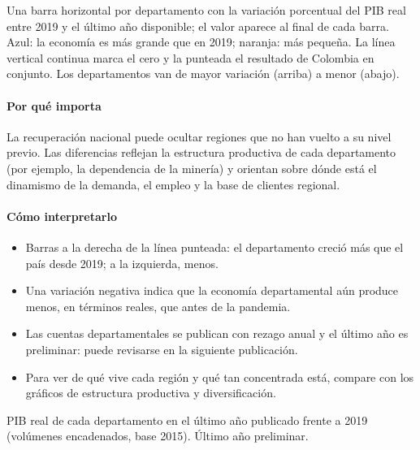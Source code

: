 \begin{leer}
Una barra horizontal por departamento con la variación porcentual del PIB real entre 2019 y el último año disponible; el valor aparece al final de cada barra. Azul: la economía es más grande que en 2019; naranja: más pequeña. La línea vertical continua marca el cero y la punteada el resultado de Colombia en conjunto. Los departamentos van de mayor variación (arriba) a menor (abajo).
\end{leer}

\paragraph{Por qué importa}
La recuperación nacional puede ocultar regiones que no han vuelto a su nivel previo. Las diferencias reflejan la estructura productiva de cada departamento (por ejemplo, la dependencia de la minería) y orientan sobre dónde está el dinamismo de la demanda, el empleo y la base de clientes regional.

\paragraph{Cómo interpretarlo}
\begin{itemize}
\item Barras a la derecha de la línea punteada: el departamento creció más que el país desde 2019; a la izquierda, menos.
\item Una variación negativa indica que la economía departamental aún produce menos, en términos reales, que antes de la pandemia.
\item Las cuentas departamentales se publican con rezago anual y el último año es preliminar: puede revisarse en la siguiente publicación.
\item Para ver de qué vive cada región y qué tan concentrada está, compare con los gráficos de estructura productiva y diversificación.
\end{itemize}
\begin{formulas}[Fórmulas]
\end{formulas}
\begin{metodo}[Metodología]
PIB real de cada departamento en el último año publicado frente a 2019 (volúmenes encadenados, base 2015). Último año preliminar.
\par{}
\end{metodo}

